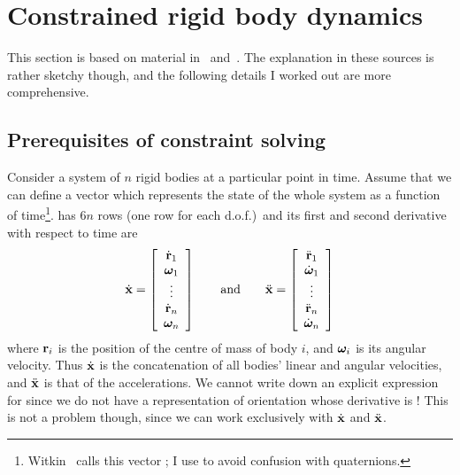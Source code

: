 \section{Constrained rigid body dynamics\label{constraints}}

This section is based on material in~\cite{BaraffWitkin:97} and~\cite{Saunders:PhD}. The
explanation in these sources is rather sketchy though, and the following details I worked
out are more comprehensive.

\subsection{Prerequisites of constraint solving\label{constraintPrerequisites}}

Consider a system of $n$ rigid bodies at a particular point in time. Assume that we can define
a vector  which represents the state of the whole system as a function of
time\footnote{Witkin~\cite{BaraffWitkin:97} calls this vector ; I use  to avoid
confusion with quaternions.}.  has $6n$ rows (one row for each d.o.f.)\ and its first and
second derivative with respect to time are
\begin{equation}
\label{lagrangeStateVector}
\dot{\ve{x}} = \left[ \begin{array}{c}
    \dot{\ve{r}}_1\\ \ve{\omega}_1\\ \vdots\\ \dot{\ve{r}}_n\\ \ve{\omega}_n \end{array}\right]
\quad\quad\mathrm{and}\quad\quad
\ddot{\ve{x}} = \left[ \begin{array}{c}
    \ddot{\ve{r}}_1\\ \dot{\ve{\omega}}_1\\ \vdots\\ \ddot{\ve{r}}_n\\ \dot{\ve{\omega}}_n
    \end{array}\right]
\end{equation}
where $\ve{r}_i$ is the position of the centre of mass of body $i$, and $\ve{\omega}_i$ is its
angular velocity. Thus $\dot{\ve{x}}$ is the concatenation of all bodies' linear and angular
velocities, and $\ddot{\ve{x}}$ is that of the accelerations. We cannot write down an explicit
expression for  since we do not have a representation of orientation whose derivative is
\ve{\omega}! This is not a problem though, since we can work exclusively with $\dot{\ve{x}}$ and
$\ddot{\ve{x}}$.

